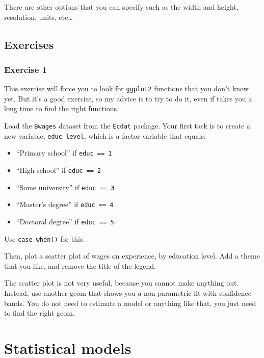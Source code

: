\documentclass[]{gitbook}
\providecommand{\tightlist}{%
  \setlength{\itemsep}{0pt}\setlength{\parskip}{0pt}}
\theoremstyle{definition}
\theoremstyle{definition}
\theoremstyle{definition}
\theoremstyle{remark}
\begin{document}
There are other options that you can specify such as the width and
height, resolution, units, etc\ldots{}

\hypertarget{exercises-3}{%
\subsection{Exercises}\label{exercises-3}}

\hypertarget{exercise-1-3}{%
\subsubsection*{Exercise 1}\label{exercise-1-3}}

This exercise will force you to look for \texttt{ggplot2} functions that
you don't know yet. But it's a good exercise, so my advice is to try to
do it, even if takes you a long time to find the right functions.

Load the \texttt{Bwages} dataset from the \texttt{Ecdat} package. Your
first task is to create a new variable, \texttt{educ\_level}, which is a
factor variable that equals:

\begin{itemize}
\tightlist
\item
  ``Primary school'' if \texttt{educ\ ==\ 1}
\item
  ``High school'' if \texttt{educ\ ==\ 2}
\item
  ``Some university'' if \texttt{educ\ ==\ 3}
\item
  ``Master's degree'' if \texttt{educ\ ==\ 4}
\item
  ``Doctoral degree'' if \texttt{educ\ ==\ 5}
\end{itemize}

Use \texttt{case\_when()} for this.

Then, plot a scatter plot of wages on experience, by education level.
Add a theme that you like, and remove the title of the legend.

The scatter plot is not very useful, because you cannot make anything
out. Instead, use another geom that shows you a non-parametric fit with
confidence bands. You do not need to estimate a model or anything like
that, you just need to find the right geom.

\hypertarget{statistical-models}{%
\section{Statistical models}\label{statistical-models}}
\end{document}
